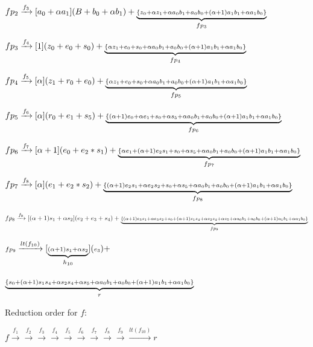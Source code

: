 \begin{Example}
\begin{tiny}
$fp_2\xrightarrow[]{f_3}[a_0+\alpha a_1](B+b_0+\alpha b_1)+\underbrace{{\scriptstyle\{z_0+\alpha z_1+\alpha a_0b_1+a_0b_0+ (\alpha+1)a_1b_1 + \alpha a_1b_0\}}}_\text{$fp_3$}$

$fp_3\xrightarrow[]{f_4}[1](z_0+e_0+s_0)+\underbrace{{\scriptstyle\{\alpha z_1+e_0+s_0+\alpha a_0b_1+a_0b_0+(\alpha+1)a_1b_1+\alpha a_1b_0\}}}_\text{$fp_4$}$

$fp_4\xrightarrow[]{f_5}[\alpha](z_1+r_0+e_0)+\underbrace{{\scriptstyle\{\alpha z_1+e_0+s_0+\alpha a_0b_1+a_0b_0+(\alpha+1)a_1b_1+\alpha a_1b_0\}}}_\text{$fp_5$}$

$fp_5\xrightarrow[]{f_6}[\alpha](r_0+e_1+s_5)+\underbrace{{\scriptstyle\{(\alpha+1)e_0+\alpha e_1+s_0+\alpha s_5+\alpha a_0b_1+a_0b_0+(\alpha+1)a_1b_1+\alpha a_1b_0\}}}_\text{$fp_6$}$

$fp_6\xrightarrow[]{f_7}[\alpha+1](e_0+e_2*s_1)+\underbrace{{\scriptstyle\{\alpha e_1+(\alpha+1)e_2s_1+s_0+\alpha s_5+\alpha a_0b_1+a_0b_0+(\alpha+1)a_1b_1+\alpha a_1b_0\}}}_\text{$fp_7$}$

$fp_7\xrightarrow[]{f_8}[\alpha](e_1+e_2*s_2)+\underbrace{{\scriptstyle\{(\alpha+1)e_2s_1+\alpha e_2s_2 + s_0+\alpha s_5+\alpha a_0b_1+a_0b_0+(\alpha+1)a_1b_1+\alpha a_1b_0\}}}_\text{$fp_8$}$

$fp_8\xrightarrow[]{f_9}[(\alpha+1)s_1 + \alpha s_2](e_2+e_3+s_4)+\underbrace{{\scriptstyle\{(\alpha+1)e_3s_1+ \alpha e_3s_2 +s_0+(\alpha+1)s_1s_4+\alpha s_2s_4+\alpha s_5+\alpha a_0b_1+a_0b_0+(\alpha+1)a_1b_1+\alpha a_1b_0\}}}_\text{$fp_9$}$
\end{tiny}

\begin{small}

${\scriptstyle fp_9}\xrightarrow[]{{\scriptstyle lt(f_{10})}}[\underbrace{{\scriptstyle (\alpha+1)s_1+\alpha s_2}}_\text{$h_{10}$}]({\scriptstyle e_3})+$ 

$\underbrace{{\scriptstyle \{s_0+(\alpha+1)s_1s_4+\alpha s_2s_4+\alpha s_5+\alpha a_0b_1+a_0b_0+(\alpha+1)a_1b_1+\alpha a_1b_0\}}}_\text{$r$}$ 
\end{small}

Reduction order for $f:$

$f\xrightarrow[]{f_{1}}\xrightarrow[]{f_2}\xrightarrow[]{f_3}\xrightarrow[]{f_4}\xrightarrow[]{f_5}\xrightarrow[]{f_6}\xrightarrow[]{f_7}\xrightarrow[]{f_8}\xrightarrow[]{f_9}\xrightarrow[]{lt(f_{10})}r$


\end{Example}
